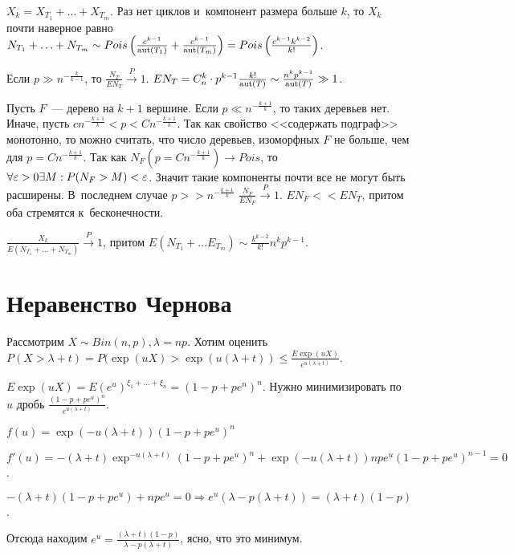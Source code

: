 \documentclass{article}
\begin{document}
$X_k = X_{T_1} + \ldots + X_{T_m}$. Раз нет циклов и~компонент размера больше $k$, то $X_k$ почти
наверное равно $N_{T_1} + \ldots + N_{T_m} \sim Pois\left(\frac{c^{k-1}}{\operatorname{aut}(T_1)} +
\frac{c^{k-1}}{\operatorname{aut}(T_m)}\right) = Pois\left(\frac{c^{k-1} k^{k-2}}{k!}\right)$.

Если $p \gg n^{-\frac{k}{k-1}}$, то $\frac{N_T}{E N_T} \overset{P}\rightarrow 1$. $E N_T = C_n^k
\cdot p^{k-1} \frac{k!}{\operatorname{aut}(T)} \sim \frac{n^k p^{k-1}}{\operatorname{aut}(T)} \gg 1$.

Пусть $F$~--- дерево на $k+1$ вершине. Если $p \ll n^{-\frac{k+1}{k}}$, то таких деревьев нет.
Иначе, пусть $c n^{-\frac{k+1}{k}} < p < C n^{-\frac{k+1}{k}}$. Так как свойство <<содержать
подграф>> монотонно, то можно считать, что число деревьев, изоморфных $F$ не больше, чем для $p =
Cn^{-\frac{k+1}{k}}$. Так как $N_F(p = Cn^{-\frac{k+1}{k}}) \rightarrow Pois$, то $\forall \varepsilon > 0
\exists M: P(N_F > M) < \varepsilon$. Значит такие компоненты почти все не могут быть расширены.
В~последнем случае $p >> n^{-\frac{k+1}{k}}$ $\frac{N_F}{E N_F} \overset{P}\rightarrow 1$. $EN_F <<
EN_T$, притом оба стремятся к~бесконечности.

\begin{corollary}
	$\frac{X_k}{E(N_{T_1} + \ldots + N_{T_m})} \overset{P}\rightarrow 1$, притом $E(N_{T_1} + \ldots
	E_{T_m}) \sim \frac{k^{k-2}}{k!} n^k p^{k-1}$.
\end{corollary}

\section{Неравенство Чернова}

Рассмотрим $X \sim Bin(n, p), \lambda = np$. Хотим оценить $P(X > \lambda + t) = P(\exp(uX) >
\exp(u(\lambda + t)) \le \frac{E\exp(uX)}{e^{u(\lambda + t)}}$.

$E\exp(uX) = E(e^u)^{\xi_1 + \ldots + \xi_n} = (1 - p + pe^n)^n$. Нужно минимизировать по $u$ дробь
$\frac{(1-p+pe^u)^n}{e^{u(\lambda + t)}}$.

$f(u) = \exp(-u(\lambda + t))(1 - p + pe^u)^n$

$f'(u) = -(\lambda + t)\exp^{-u(\lambda + t)}(1 - p + pe^u)^n + \exp(-u(\lambda + t)) npe^u(1 - p +
pe^u)^{n-1} = 0$.

$-(\lambda + t)(1 - p + pe^u) + npe^u = 0 \Rightarrow e^u (\lambda - p(\lambda + t)) = (\lambda +
t)(1 - p)$.

Отсюда находим $e^u = \frac{(\lambda + t)(1 - p)}{\lambda - p(\lambda + t)}$, ясно, что это минимум.
\end{document}

